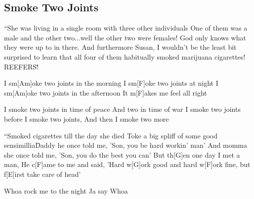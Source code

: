 \subsection*{Smoke Two Joints   }
\begin{guitar}
``She was living in a single room with three other individuals 
 One of them was a male and the other two...well 
 the other two were females! 
 God only knows what they were up to in there. 
 And furthermore Susan, I wouldn't be the least bit surprised to learn that 
 all four of them habitually smoked marijuana cigarettes!
 REEFERS!\" 

 
I sm[Am]oke two joints in the morning 
I sm[F]oke two joints at night 
I sm[Am]oke two joints in the afternoon 
It m[F]akes me feel all right 
 
I smoke two joints in time of peace 
And two in time of war 
I smoke two joints before I smoke two joints, 
And then I smoke two more 
 

 
``Smoked cigarettes till the day she died
Toke a big spliff of some good sensimillia\"
 
Daddy he once told me, 
'Son, you be hard workin' man' 
And momma she once told me, 
'Son, you do the best you can' 
But th[G]en one day I met a man, 
He c[F]ame to me and said, 
'Hard w[G]ork good and hard w[F]ork fine, 
but f[E]irst take care of head'
 
Whoa rock me to the night 
Ja say Whoa

\end{guitar}
